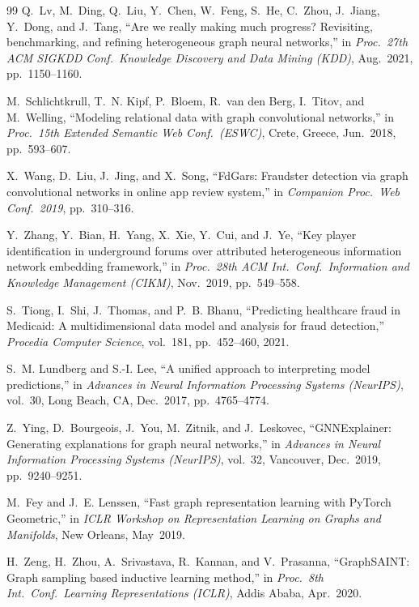 \documentclass[pdflatex,sn-mathphys-num]{sn-jnl}
\theoremstyle{thmstyleone}
\theoremstyle{thmstyletwo}
\theoremstyle{thmstylethree}
\begin{document}
\begin{thebibliography}{99}
Q.~Lv, M.~Ding, Q.~Liu, Y.~Chen, W.~Feng, S.~He, C.~Zhou, J.~Jiang,
Y.~Dong, and J.~Tang,
``Are we really making much progress? Revisiting, benchmarking, and
refining heterogeneous graph neural networks,''
in \textit{Proc.\ 27th ACM SIGKDD Conf.\ Knowledge Discovery and Data
Mining (KDD)}, Aug.~2021, pp.~1150--1160.

M.~Schlichtkrull, T.~N. Kipf, P.~Bloem, R.~van den Berg,
I.~Titov, and M.~Welling,
``Modeling relational data with graph convolutional networks,''
in \textit{Proc.\ 15th Extended Semantic Web Conf.\ (ESWC)},
Crete, Greece, Jun.~2018, pp.~593--607.

X.~Wang, D.~Liu, J.~Jing, and X.~Song,
``FdGars: Fraudster detection via graph convolutional networks in
online app review system,''
in \textit{Companion Proc.\ Web Conf.\ 2019}, pp.~310--316.

Y.~Zhang, Y.~Bian, H.~Yang, X.~Xie, Y.~Cui, and J.~Ye,
``Key player identification in underground forums over attributed
heterogeneous information network embedding framework,''
in \textit{Proc.\ 28th ACM Int.\ Conf.\ Information and Knowledge
Management (CIKM)}, Nov.~2019, pp.~549--558.

S.~Tiong, I.~Shi, J.~Thomas, and P.~B. Bhanu,
``Predicting healthcare fraud in Medicaid: A multidimensional data
model and analysis for fraud detection,''
\textit{Procedia Computer Science}, vol.~181, pp.~452--460, 2021.

S.~M. Lundberg and S.-I. Lee,
``A unified approach to interpreting model predictions,''
in \textit{Advances in Neural Information Processing Systems (NeurIPS)},
vol.~30, Long Beach, CA, Dec.~2017, pp.~4765--4774.

Z.~Ying, D.~Bourgeois, J.~You, M.~Zitnik, and J.~Leskovec,
``GNNExplainer: Generating explanations for graph neural networks,''
in \textit{Advances in Neural Information Processing Systems (NeurIPS)},
vol.~32, Vancouver, Dec.~2019, pp.~9240--9251.

M.~Fey and J.~E. Lenssen,
``Fast graph representation learning with PyTorch Geometric,''
in \textit{ICLR Workshop on Representation Learning on Graphs and
Manifolds}, New Orleans, May~2019.

H.~Zeng, H.~Zhou, A.~Srivastava, R.~Kannan, and V.~Prasanna,
``GraphSAINT: Graph sampling based inductive learning method,''
in \textit{Proc.\ 8th Int.\ Conf.\ Learning Representations (ICLR)},
Addis Ababa, Apr.~2020.

\end{thebibliography}
\end{document}
